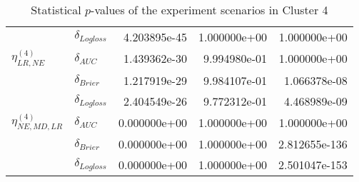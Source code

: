 \begin{table}[!h]
\begin{tabular}{l|lrrr}
                              & $\delta_{Logloss}$ &           4.203895e-45 &     1.000000e+00 &             1.000000e+00 \\
    $\eta^{(4)}_{LR, NE}$ & $\delta_{AUC}$ &           1.439362e-30 &     9.994980e-01 &             1.000000e+00 \\
                              & $\delta_{Brier}$ &           1.217919e-29 &     9.984107e-01 &             1.066378e-08 \\
                              & $\delta_{Logloss}$ &           2.404549e-26 &     9.772312e-01 &             4.468989e-09 \\
    $\eta^{(4)}_{NE, MD, LR}$ & $\delta_{AUC}$ &           0.000000e+00 &     1.000000e+00 &             1.000000e+00 \\
                              & $\delta_{Brier}$ &           0.000000e+00 &     1.000000e+00 &            2.812655e-136 \\
                              & $\delta_{Logloss}$ &           0.000000e+00 &     1.000000e+00 &            2.501047e-153 \\
    \bottomrule
    \end{tabular}
    \caption{Statistical $p$-values of the experiment scenarios in Cluster 4}
    \end{table}
    
